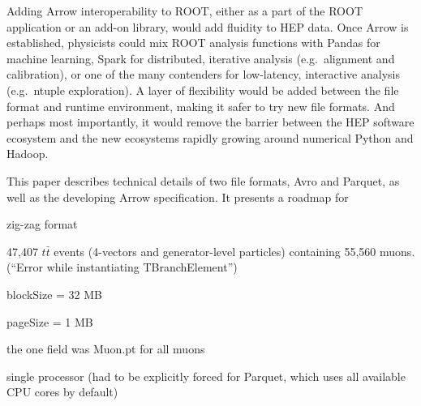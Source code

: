 \documentclass{article}
\begin{document}
Adding Arrow interoperability to ROOT, either as a part of the ROOT application or an add-on library, would add fluidity to HEP data. Once Arrow is established, physicists could mix ROOT analysis functions with Pandas for machine learning, Spark for distributed, iterative analysis (e.g.\ alignment and calibration), or one of the many contenders for low-latency, interactive analysis (e.g.\ ntuple exploration). A layer of flexibility would be added between the file format and runtime environment, making it safer to try new file formats. And perhaps most importantly, it would remove the barrier between the HEP software ecosystem and the new ecosystems rapidly growing around numerical Python and Hadoop.

This paper describes technical details of two file formats, Avro and Parquet, as well as the developing Arrow specification. It presents a roadmap for 











\pagebreak

zig-zag format

47,407 $t\bar{t}$ events (4-vectors and generator-level particles) containing 55,560 muons. (``Error while instantiating TBranchElement'')

blockSize = 32 MB

pageSize = 1 MB

the one field was Muon.pt for all muons

single processor (had to be explicitly forced for Parquet, which uses all available CPU cores by default)

\renewcommand{\arraystretch}{1.2}
\end{document}
